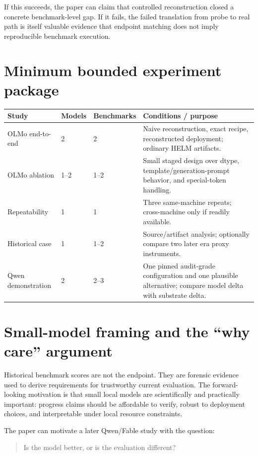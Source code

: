 \documentclass[11pt,oneside]{report}
\begin{document}
If this succeeds, the paper can claim that controlled reconstruction closed a concrete benchmark-level gap. If it fails, the failed translation from probe to real path is itself valuable evidence that endpoint matching does not imply reproducible benchmark execution.

\section{Minimum bounded experiment package}

\begin{longtable}{@{}P{0.25\textwidth}P{0.15\textwidth}P{0.16\textwidth}P{0.34\textwidth}@{}}
\toprule
Study & Models & Benchmarks & Conditions / purpose \\
\midrule
OLMo end-to-end & 2 & 2 & Naive reconstruction, exact recipe, reconstructed deployment; ordinary HELM artifacts. \\
OLMo ablation & 1--2 & 1--2 & Small staged design over dtype, template/generation-prompt behavior, and special-token handling. \\
Repeatability & 1 & 1 & Three same-machine repeats; cross-machine only if readily available. \\
Historical case & 1 & 1--2 & Source/artifact analysis; optionally compare two later era proxy instruments. \\
Qwen demonstration & 2 & 2--3 & One pinned audit-grade configuration and one plausible alternative; compare model delta with substrate delta. \\
\bottomrule
\end{longtable}

\section{Small-model framing and the ``why care'' argument}

Historical benchmark scores are not the endpoint. They are forensic evidence used to derive requirements for trustworthy current evaluation. The forward-looking motivation is that small local models are scientifically and practically important: progress claims should be affordable to verify, robust to deployment choices, and interpretable under local resource constraints.

The paper can motivate a later Qwen/Fable study with the question:

\begin{quote}
Is the model better, or is the evaluation different?
\end{quote}
\end{document}
